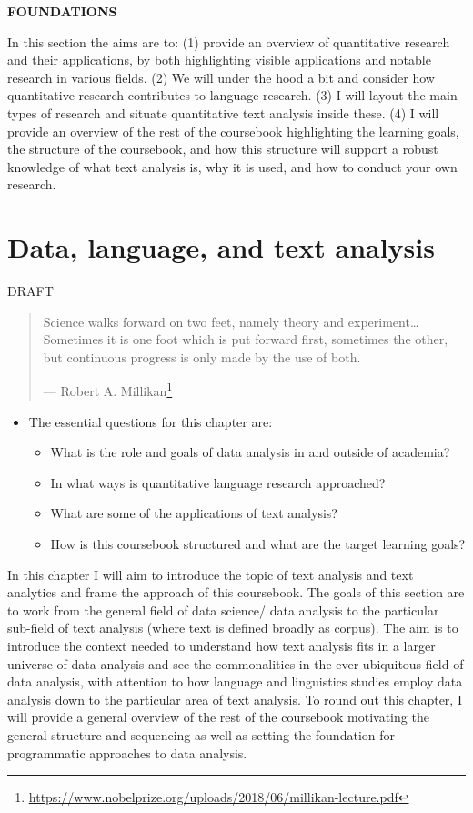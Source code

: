 \documentclass[
]{article}
\DeclareRobustCommand{\href}[2]{#2\footnote{\url{#1}}}
\providecommand{\tightlist}{%
  \setlength{\itemsep}{0pt}\setlength{\parskip}{0pt}}
\newenvironment{rmdblock}[1]
  {\begin{shaded*}
  \begin{itemize}
  \renewcommand{\labelitemi}{
    \raisebox{-.5\height}[0pt][0pt]{
      {\setkeys{Gin}{width=2em,keepaspectratio}\texttt{[image: assets/images/\#1]}}
    }
  }
  \item
  }
  {
  \end{itemize}
  \end{shaded*}
  }
\newenvironment{rmdkey}
  {\begin{rmdblock}{key}}
  {\end{rmdblock}}
\begin{document}
\textbf{FOUNDATIONS}

In this section the aims are to: (1) provide an overview of quantitative research and their applications, by both highlighting visible applications and notable research in various fields. (2) We will under the hood a bit and consider how quantitative research contributes to language research. (3) I will layout the main types of research and situate quantitative text analysis inside these. (4) I will provide an overview of the rest of the coursebook highlighting the learning goals, the structure of the coursebook, and how this structure will support a robust knowledge of what text analysis is, why it is used, and how to conduct your own research.

\hypertarget{data-language-and-text-analysis}{%
\section{Data, language, and text analysis}\label{data-language-and-text-analysis}}

DRAFT

\begin{quote}
Science walks forward on two feet, namely theory and experiment\ldots Sometimes it is one foot which is put forward first, sometimes the other, but continuous progress is only made by the use of both.

--- \href{https://www.nobelprize.org/uploads/2018/06/millikan-lecture.pdf}{Robert A. Millikan} \citeyearpar{Millikan1923}
\end{quote}

\begin{rmdkey}
The essential questions for this chapter are:

\begin{itemize}
\tightlist
\item
  What is the role and goals of data analysis in and outside of
  academia?
\item
  In what ways is quantitative language research approached?
\item
  What are some of the applications of text analysis?
\item
  How is this coursebook structured and what are the target learning
  goals?
\end{itemize}
\end{rmdkey}

In this chapter I will aim to introduce the topic of text analysis and text analytics and frame the approach of this coursebook. The goals of this section are to work from the general field of data science/ data analysis to the particular sub-field of text analysis (where text is defined broadly as corpus). The aim is to introduce the context needed to understand how text analysis fits in a larger universe of data analysis and see the commonalities in the ever-ubiquitous field of data analysis, with attention to how language and linguistics studies employ data analysis down to the particular area of text analysis. To round out this chapter, I will provide a general overview of the rest of the coursebook motivating the general structure and sequencing as well as setting the foundation for programmatic approaches to data analysis.
\end{document}
